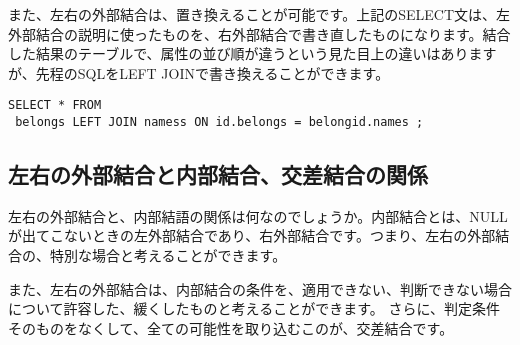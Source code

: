 また、左右の外部結合は、置き換えることが可能です。上記のSELECT文は、左外部結合の説明に使ったものを、右外部結合で書き直したものになります。結合した結果のテーブルで、属性の並び順が違うという見た目上の違いはありますが、先程のSQLをLEFT JOINで書き換えることができます。

\begin{verbatim}
SELECT * FROM
 belongs LEFT JOIN namess ON id.belongs = belongid.names ;
\end{verbatim}


\subsection{左右の外部結合と内部結合、交差結合の関係}

左右の外部結合と、内部結語の関係は何なのでしょうか。内部結合とは、NULLが出てこないときの左外部結合であり、右外部結合です。つまり、左右の外部結合の、特別な場合と考えることができます。

また、左右の外部結合は、内部結合の条件を、適用できない、判断できない場合について許容した、緩くしたものと考えることができます。
さらに、判定条件そのものをなくして、全ての可能性を取り込むこのが、交差結合です。


